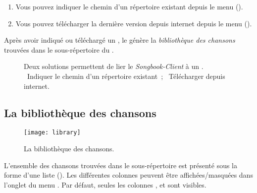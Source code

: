 \begin{enumerate}
\item Vous pouvez indiquer le chemin d'un répertoire
   existant depuis le menu
   ().
\item Vous pouvez télécharger la dernière version depuis internet
  depuis le menu 
  ().
\end{enumerate}

Après avoir indiqué ou téléchargé un \songbook, le \client génère la
\emph{bibliothèque des chansons} trouvées dans le sous-répertoire
 du \songbook.


\begin{figure}
  \centering
  \hspace{0.1cm}%
  \caption{%
    Deux solutions permettent de lier le \emph{Songbook-Client} à un \songbook.
    ~Indiquer le chemin d'un répertoire existant~;%
    ~Télécharger depuis internet.%
  }%
  \label{fig:solutions}
\end{figure}


\subsection{La bibliothèque des chansons}

\begin{figure}
  \centering
  \texttt{[image: library]}
  \caption{La bibliothèque des chansons.}
  \label{fig:library}
\end{figure}

L'ensemble des chansons  trouvées dans le sous-répertoire
 est présenté sous la forme d'une liste
(). Les différentes colonnes peuvent être
affichées/masquées dans l'onglet  du menu
. Par défaut, seules les colonnes
,  et  sont visibles.

